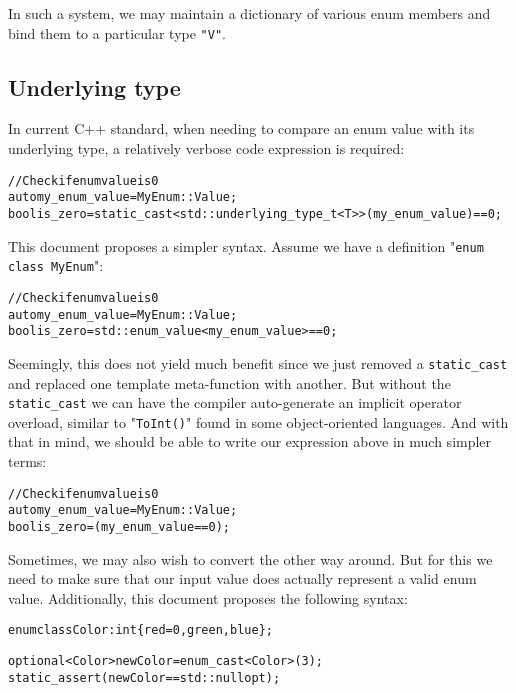 \documentclass[a4paper, 12pt]{article}
\begin{document}
In such a system, we may maintain a dictionary of various enum members and bind
them to a particular type \texttt{"V"}.

\subsection{Underlying type}

In current C++ standard, when needing to compare an enum value with its
underlying type, a relatively verbose code expression is required:

\begin{alltt}\footnotesize
// Check if enum value is 0
auto my\_enum\_value = MyEnum::Value;
bool is\_zero = static\_cast<std::underlying\_type\_t<T>>(my\_enum\_value) == 0;
\end{alltt}

\noindent
This document proposes a simpler syntax. Assume we have a definition
"\texttt{enum class MyEnum}":

\begin{alltt}\footnotesize
// Check if enum value is 0
auto my\_enum\_value = MyEnum::Value;
bool is\_zero = std::enum\_value<my\_enum\_value> == 0;
\end{alltt}

\noindent
Seemingly, this does not yield much benefit since we just removed a
\texttt{static\_cast} and replaced one template meta-function with another.
But without the \texttt{static\_cast} we can have the compiler auto-generate
an implicit operator overload, similar to "\texttt{ToInt()}" found in some
object-oriented languages. And with that in mind, we should be able to write
our expression above in much simpler terms:

\begin{alltt}\footnotesize
// Check if enum value is 0
auto my\_enum\_value = MyEnum::Value;
bool is\_zero = (my\_enum\_value == 0);
\end{alltt}

\noindent
Sometimes, we may also wish to convert the other way around. But for this
we need to make sure that our input value does actually represent a valid
enum value. Additionally, this document proposes the following syntax:

\begin{alltt}\footnotesize
enum class Color : int \{ red = 0, green, blue \};

optional<Color> newColor = enum\_cast<Color>(3);
static\_assert(newColor == std::nullopt);
\end{alltt}
\end{document}
